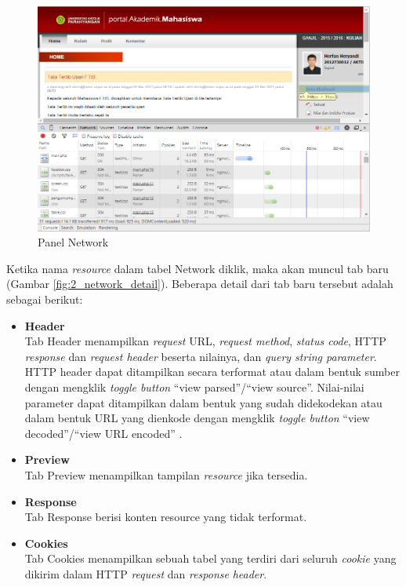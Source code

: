 \begin{figure}[H]
	\centering
	\includegraphics[scale=0.5]{Gambar/network-panel}
	\caption{Panel Network} 
	\label{fig:2_network_panel}
\end{figure}


Ketika nama \textit{resource} dalam tabel Network diklik, maka akan muncul tab baru (Gambar \ref{fig:2_network_detail}). Beberapa detail dari tab baru tersebut adalah sebagai berikut:
\begin{itemize}
	\item \textbf{Header}\\
	Tab Header menampilkan \textit{request} URL, \textit{request method}, \textit{status code}, HTTP \textit{response} dan \textit{request header} beserta nilainya, dan \textit{query string parameter}. HTTP header dapat ditampilkan secara terformat atau dalam bentuk sumber dengan mengklik \textit{toggle button} "`view parsed"'/"`view source"'. Nilai-nilai parameter dapat ditampilkan dalam bentuk yang sudah didekodekan atau dalam bentuk URL yang dienkode dengan mengklik \textit{toggle button} "`view decoded"'/"`view URL encoded"' .
	\item \textbf{Preview}\\
	Tab Preview menampilkan tampilan \textit{resource} jika tersedia.
	\item \textbf{Response}\\
	Tab Response berisi konten resource yang tidak terformat.
	\item \textbf{Cookies}\\
	Tab Cookies menampilkan sebuah tabel yang terdiri dari seluruh \textit{cookie} yang dikirim dalam HTTP \textit{request} dan \textit{response} \textit{header}.
\end{itemize}

